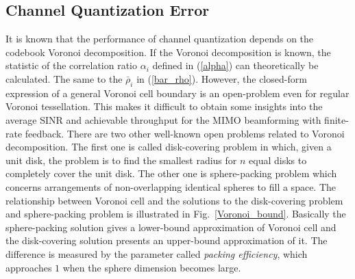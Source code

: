 \documentclass[10pt,fleqn, twocolumn]{IEEEtran}
\begin{document}
\subsection{Channel Quantization Error}
\begin{figure}
\end{figure}
It is known that the performance of channel quantization depends
on the codebook Voronoi decomposition. If the Voronoi
decomposition is known, the statistic of the correlation ratio
$\alpha_i$ defined in (\ref{alpha}) can theoretically be
calculated. The same to the $\bar\rho_{i}$ in (\ref{bar_rho}).
However, the closed-form expression of a general Voronoi cell
boundary is an open-problem even for regular Voronoi tessellation.
This makes it difficult to obtain some insights into the average
SINR and achievable throughput for the MIMO beamforming with
finite-rate feedback. There are two other well-known open problems
related to Voronoi decomposition. The first one is called
disk-covering problem in which, given a unit disk, the problem is
to find the smallest radius for $n$ equal disks to completely
cover the unit disk. The other one is sphere-packing problem which
concerns arrangements of non-overlapping identical spheres to fill
a space. The relationship between Voronoi cell and the solutions
to the disk-covering problem and sphere-packing problem is
illustrated in Fig.~\ref{Voronoi_bound}. Basically the
sphere-packing solution gives a lower-bound approximation of
Voronoi cell and the disk-covering solution presents an
upper-bound approximation of it. The difference is measured by the
parameter called {\em packing efficiency}, which approaches $1$
when the sphere dimension becomes large.
\end{document}
